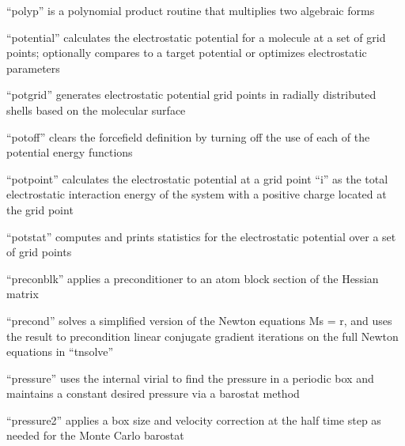 \documentclass[letterpaper,11pt,english]{sphinxmanual}
\begin{document}
“polyp” is a polynomial product routine that multiplies two
algebraic forms


“potential” calculates the electrostatic potential for a
molecule at a set of grid points; optionally compares to a
target potential or optimizes electrostatic parameters


“potgrid” generates electrostatic potential grid points in
radially distributed shells based on the molecular surface



“potoff” clears the forcefield definition by turning off
the use of each of the potential energy functions


“potpoint” calculates the electrostatic potential at a grid
point “i” as the total electrostatic interaction energy of
the system with a positive charge located at the grid point


“potstat” computes and prints statistics for the electrostatic
potential over a set of grid points



“preconblk” applies a preconditioner to an atom block section
of the Hessian matrix


“precond” solves a simplified version of the Newton equations
Ms = r, and uses the result to precondition linear conjugate
gradient iterations on the full Newton equations in “tnsolve”


“pressure” uses the internal virial to find the pressure
in a periodic box and maintains a constant desired pressure
via a barostat method


“pressure2” applies a box size and velocity correction at
the half time step as needed for the Monte Carlo barostat

\end{document}
